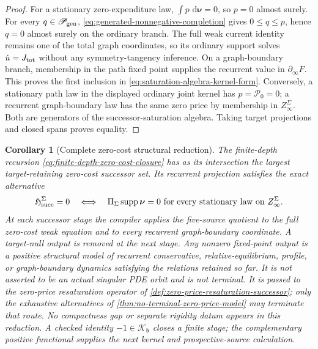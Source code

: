 \documentclass[11pt]{article}
\numberwithin{section}{part}
\theoremstyle{plain}
\newtheorem{corollary}[corollary]{Corollary}
\theoremstyle{definition}
\theoremstyle{remark}
\newcommand{\dd}{\,\mathrm d}
\DeclareMathOperator{\supp}{supp}
\begin{document}
\begin{proof}
For a stationary zero-expenditure law,
\(\int p\,\dd\boldsymbol\nu=0\), so \(p=0\) almost surely.  For every
\(q\in\mathscr P_{\rm gen}\),
\eqref{eq:generated-nonnegative-completion} gives \(0\le q\le p\), hence
\(q=0\) almost surely on the ordinary branch.  The full weak
current identity remains one of the total graph coordinates, so its ordinary
support solves \(\dot u=J_{\rm tot}\) without any symmetry-tangency inference.
On a graph-boundary branch, membership in the path fixed point supplies the
recurrent value in \(\partial_\infty F\).  This proves the first inclusion in
\eqref{eq:saturation-algebra-kernel-form}.  Conversely, a stationary path law
in the displayed ordinary joint kernel has \(p=\mathcal P_0=0\); a recurrent
graph-boundary law has the same zero price by membership in
\(Z_\infty^\Sigma\).  Both are generators of the successor-saturation algebra.
Taking target projections and closed spans proves equality.
\end{proof}

\begin{corollary}[Complete zero-cost structural reduction]
\label{cor:algebraic-equality-reduction}
The finite-depth recursion \eqref{eq:finite-depth-zero-cost-closure} has as its
intersection the largest target-retaining zero-cost successor set.  Its recurrent projection
satisfies the exact alternative
\begin{equation}
 \label{eq:zero-cost-structural-alternative}
 \mathfrak H_{\rm succ}^{\Sigma}=0
 \quad\Longleftrightarrow\quad
 \Pi_\Sigma\supp\boldsymbol\nu=0
 \text{ for every stationary law on }Z_\infty^\Sigma.
\end{equation}
At each successor stage the compiler applies the five-source quotient to the
full zero-cost weak equation and to every recurrent graph-boundary coordinate.
A target-null output is removed at the next stage.  Any nonzero fixed-point
output is a positive structural model of recurrent conservative,
relative-equilibrium, profile, or graph-boundary dynamics satisfying the
relations retained so far.  It is not asserted to be an actual singular PDE
orbit and is not terminal.  It is passed to the zero-price resaturation
operator of \cref{def:zero-price-resaturation-successor}; only the exhaustive
alternatives of \cref{thm:no-terminal-zero-price-model} may terminate that
route.  No compactness gap or separate rigidity datum appears in this
reduction.  A checked identity \(-1\in\mathcal K_{\mathfrak b}\) closes a finite
stage; the complementary positive functional supplies the next kernel and
prospective-source calculation.
\end{corollary}
\end{document}
